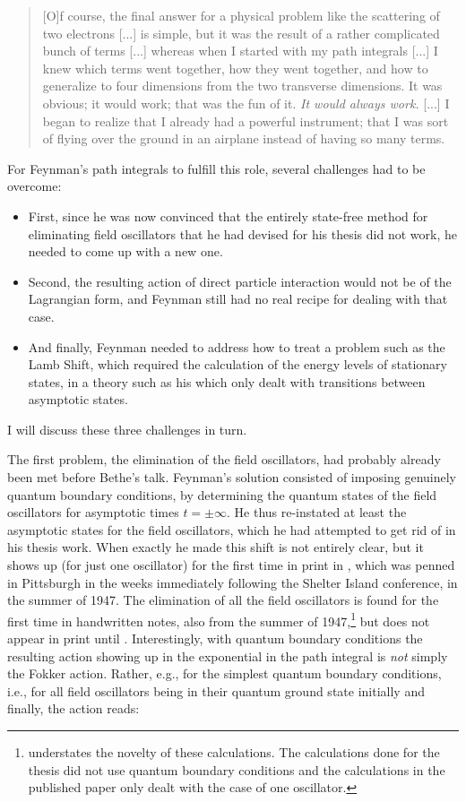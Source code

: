 \documentclass[12pt]{article}
\begin{document}
\begin{quote}
[O]f course, the final answer for a physical problem like the scattering of two electrons [...] is simple, but it was the result of a rather complicated bunch of terms  [...] whereas when I started with my path integrals [...] I knew which terms went together, how they went together, and how to generalize to four dimensions from the two transverse dimensions. It was obvious; it would work; that was the fun of it. \emph{It would always work.} [...] I began to realize that I already had a powerful instrument; that I was sort of flying over the ground in an airplane instead of having so many terms.
\end{quote}

For Feynman's path integrals to fulfill this role, several challenges had to be overcome:

\begin{itemize}
\item First, since he was now convinced that the entirely state-free method for eliminating field oscillators that he had devised for his thesis did not work, he needed to come up with a new one. 
\item Second, the resulting action of direct particle interaction would not be of the Lagrangian form, and Feynman still had no real recipe for dealing with that case. 
\item And finally, Feynman needed to address how to treat a problem such as the Lamb Shift, which required the calculation of the energy levels of stationary states, in a theory such as his which only dealt with transitions between asymptotic states.
\end{itemize}

I will discuss these three challenges in turn.

The first problem, the elimination of the field oscillators, had probably already been met before Bethe's talk. Feynman's solution consisted of imposing genuinely quantum boundary conditions, by determining the quantum states of the field oscillators for asymptotic times $t=\pm \infty$. He thus re-instated at least the asymptotic states for the field oscillators, which he had attempted to get rid of in his thesis work. When exactly he made this shift is not entirely clear, but it shows up (for just one oscillator) for the first time in print in \citep{feynman_1948_space-time}, which was penned in Pittsburgh in the weeks immediately following the Shelter Island conference, in the summer of 1947. The elimination of all the field oscillators is found for the first time in handwritten notes, also from the summer of 1947,\footnote{\citep[p. 479]{schweber_1986_feynman} understates the novelty of these calculations. The calculations done for the thesis did not use quantum boundary conditions and the calculations in the published paper only dealt with the case of one oscillator.} but does not appear in print until \citep{feynman_1950_mathematical}. Interestingly, with quantum boundary conditions the resulting action showing up in the exponential in the path integral is \emph{not} simply the Fokker action. Rather, e.g., for the simplest quantum boundary conditions, i.e., for all field oscillators being in their quantum ground state initially and finally, the action reads:
\end{document}
